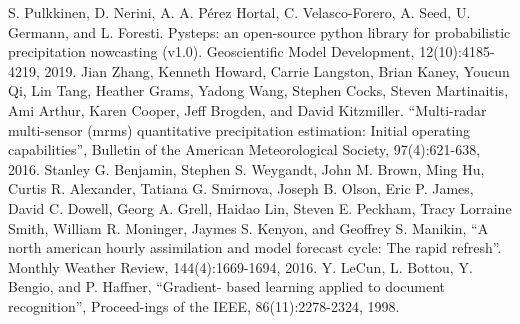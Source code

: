 \begin{thebibliography}{99}
S. Pulkkinen, D. Nerini, A. A. P\'{e}rez Hortal, C. Velasco-Forero, A. Seed, U. Germann, and L. Foresti. Pysteps: an open-source python library for probabilistic precipitation nowcasting (v1.0). Geoscientific Model Development, 12(10):4185-4219, 2019.
Jian Zhang, Kenneth Howard, Carrie Langston, Brian Kaney, Youcun Qi, Lin Tang, Heather Grams, Yadong Wang, Stephen Cocks, Steven Martinaitis, Ami Arthur, Karen Cooper, Jeff Brogden, and David Kitzmiller. ``Multi-radar multi-sensor (mrms) quantitative precipitation estimation: Initial operating capabilities'', Bulletin of the American Meteorological Society, 97(4):621-638, 2016.
Stanley G. Benjamin, Stephen S. Weygandt, John M. Brown, Ming Hu, Curtis R. Alexander, Tatiana G. Smirnova, Joseph B. Olson, Eric P. James, David C. Dowell, Georg A. Grell, Haidao Lin, Steven E. Peckham, Tracy Lorraine Smith, William R. Moninger, Jaymes S. Kenyon, and Geoffrey S. Manikin, ``A north american hourly assimilation and model forecast cycle: The rapid refresh''. Monthly Weather Review, 144(4):1669-1694, 2016.
Y. LeCun, L. Bottou, Y. Bengio, and P. Haffner, ``Gradient- based learning applied to document recognition'', Proceed-ings of the IEEE, 86(11):2278-2324, 1998. 


\end{thebibliography}


